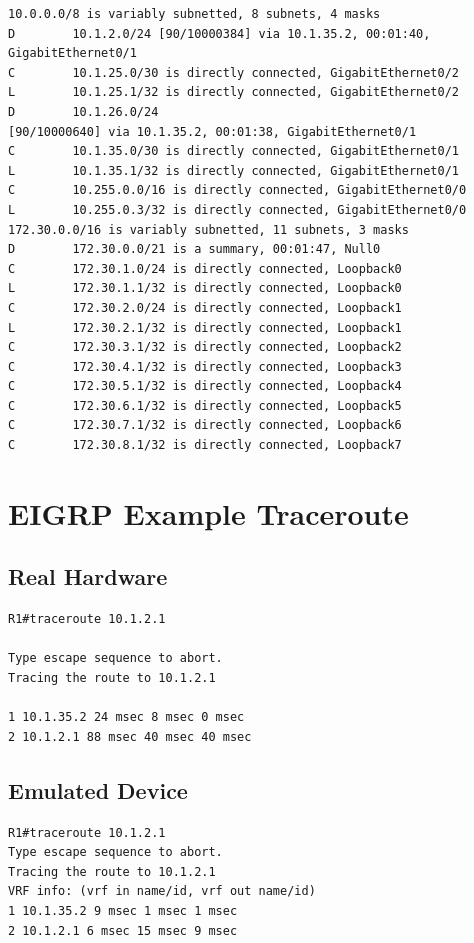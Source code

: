 \documentclass[11pt]{report}
\begin{document}
\begin{appendices}
\begin{lstlisting}
10.0.0.0/8 is variably subnetted, 8 subnets, 4 masks
D        10.1.2.0/24 [90/10000384] via 10.1.35.2, 00:01:40, GigabitEthernet0/1
C        10.1.25.0/30 is directly connected, GigabitEthernet0/2
L        10.1.25.1/32 is directly connected, GigabitEthernet0/2
D        10.1.26.0/24
[90/10000640] via 10.1.35.2, 00:01:38, GigabitEthernet0/1
C        10.1.35.0/30 is directly connected, GigabitEthernet0/1
L        10.1.35.1/32 is directly connected, GigabitEthernet0/1
C        10.255.0.0/16 is directly connected, GigabitEthernet0/0
L        10.255.0.3/32 is directly connected, GigabitEthernet0/0
172.30.0.0/16 is variably subnetted, 11 subnets, 3 masks
D        172.30.0.0/21 is a summary, 00:01:47, Null0
C        172.30.1.0/24 is directly connected, Loopback0
L        172.30.1.1/32 is directly connected, Loopback0
C        172.30.2.0/24 is directly connected, Loopback1
L        172.30.2.1/32 is directly connected, Loopback1
C        172.30.3.1/32 is directly connected, Loopback2
C        172.30.4.1/32 is directly connected, Loopback3
C        172.30.5.1/32 is directly connected, Loopback4
C        172.30.6.1/32 is directly connected, Loopback5
C        172.30.7.1/32 is directly connected, Loopback6
C        172.30.8.1/32 is directly connected, Loopback7
\end{lstlisting}

\section{EIGRP Example Traceroute}

\subsection{Real Hardware}
\begin{lstlisting}
R1#traceroute 10.1.2.1

Type escape sequence to abort.
Tracing the route to 10.1.2.1

1 10.1.35.2 24 msec 8 msec 0 msec
2 10.1.2.1 88 msec 40 msec 40 msec
\end{lstlisting}

\subsection{Emulated Device}
\begin{lstlisting}
R1#traceroute 10.1.2.1
Type escape sequence to abort.
Tracing the route to 10.1.2.1
VRF info: (vrf in name/id, vrf out name/id)
1 10.1.35.2 9 msec 1 msec 1 msec
2 10.1.2.1 6 msec 15 msec 9 msec
\end{lstlisting}


\end{appendices}
\end{document}

